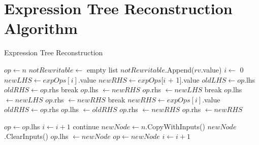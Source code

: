 \documentclass[12pt,openany,a4paper]{book}
\begin{document}
\section{Expression Tree Reconstruction Algorithm}
\label{reconstructtree}
\begin{algorithm}[H]
    \caption{Expression Tree Reconstruction} 
    \begin{algorithmic}[1]
            \State $op \gets n$
            \State $notRewritable \gets$ empty list
                \State $notRewritable$.Append($rv$.value)
            \EndFor
            \State $i \gets$ 0
                    \State $newLHS \gets expOps[i]$.value
                    \State $newRHS \gets expOps[i$ $+$ 1$]$.value
                    \State $oldLHS \gets op$.lhs
                    \State $oldRHS \gets op$.rhs
                        \State break
                    \EndIf
                        \State $op$.lhs $\gets newRHS$
                        \State $op$.rhs $\gets newLHS$
                        \State break
                    \EndIf
                        \State $op$.lhs $\gets newLHS$
                    \EndIf
                        \State $op$.rhs $\gets newRHS$
                    \EndIf
                    \State break
                \EndIf
                \State $newRHS \gets expOps[i]$.value
                        \State $oldRHS \gets op$.rhs
                        \State $op$.lhs $\gets oldRHS$
                        \State $op$.rhs $\gets newRHS$
                    \Else
                        \State $op$.rhs $\gets newRHS$
                    \EndIf
                \EndIf
    \end{algorithmic}
\end{algorithm}

\begin{algorithm}[H]
    \begin{algorithmic}[1]
                    \State $op \gets op$.lhs
                    \State $i \gets i + 1$
                    \State continue
                \EndIf
            \EndIf
            \State $newNode \gets n$.CopyWithInputs()
            \State $newNode$.ClearInputs()
            \State $op$.lhs $\gets newNode$
            \State $op \gets newNode$
            \State $i \gets i + 1$
            \EndWhile
        \EndProcedure
    \end{algorithmic}
\end{algorithm}
\end{document}
